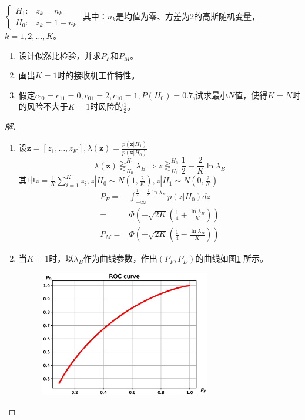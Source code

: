 \documentclass{article}
\begin{document}
\begin{enumerate}
\begin{enumerate}[label=(\arabic*)]
$\begin{cases}
H_1 : & z_k = n_k \\
H_0 : & z_k = 1 + n_k
\end{cases}$
其中：$n_k$是均值为零、方差为2的高斯随机变量，$k=1,2,\dots,K$。
\begin{enumerate}[label=(\alph*)]
\item 设计似然比检验，并求$P_F$和$P_M$。
\item 画出$K=1$时的接收机工作特性。
\item 假定$c_{00}=c_{11}=0,c_{01}=2,c_{10}=1,P(H_0)=0.7$,试求最小$N$值，使得$K=N$时的风险不大于$K=1$时风险的$\frac{1}{2}$。
\end{enumerate}
\begin{proof}[解]
\begin{enumerate}[label=(\alph*)]
\item 设$\bm{z}=[z_1,\dots,z_K],\lambda(\bm{z})=\frac{p(\bm{z}|H_1)}{p(\bm{z}|H_0)}$
$$
\lambda(\bm{z})\mathop{\gtreqless}_{H_0}^{H_1} \lambda_B \Rightarrow z \mathop{\gtreqless}_{H_1}^{H_0} \frac{1}{2}-\frac{2}{K}\ln \lambda_B
$$
其中$z=\frac{1}{K}\sum_{i=1}^K z_i,z|H_0 \sim N(1,\frac{2}{K}),z|H_1 \sim N(0,\frac{2}{K})$
\begin{align*}
P_F = & \int_{-\infty}^{\frac{1}{2}-\frac{2}{K}\ln \lambda_B} p(z|H_0)dz \\
    = & \Phi\left(-\sqrt{2K}(\frac{1}{4}+\frac{\ln \lambda_B}{K})\right) \\
P_M = & \Phi\left(-\sqrt{2K}(\frac{1}{4}-\frac{\ln \lambda_B}{K})\right)
\end{align*}
\item 当$K=1$时，以$\lambda_B$作为曲线参数，作出$(P_F,P_D)$的曲线如图\ref{fig:ROC_curve} 所示。

\begin{figure}[!ht]
\centering
\includegraphics[width=0.7\textwidth]{ROC_curve.eps}
\caption{}\label{fig:ROC_curve}
\end{figure}


\end{enumerate}
\end{proof}
\end{enumerate}
\end{enumerate}
\end{document}
